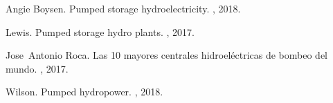 \documentclass[a4paper,11 pt]{article}
\begin{document}
\begin{thebibliography}{1}

Angie Boysen.
\newblock Pumped storage hydroelectricity.
, 2018.

Lewis.
\newblock Pumped storage hydro plants.
, 2017.

Jose~Antonio Roca.
\newblock Las 10 mayores centrales hidroeléctricas de bombeo del mundo.
, 2017.

Wilson.
\newblock Pumped hydropower.
, 2018.

\end{thebibliography}
\end{document}
